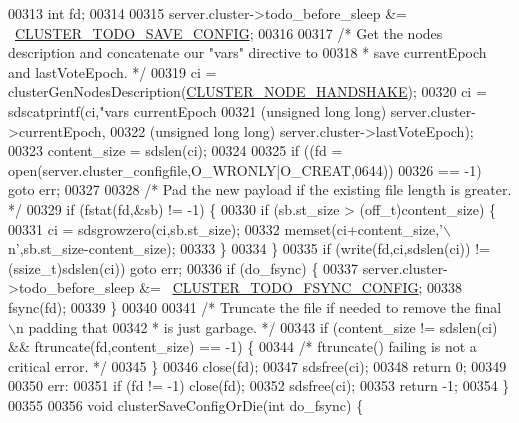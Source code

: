 \begin{DoxyCode}
{{{00313     \textcolor{keywordtype}{int} fd;
00314 
00315     server.cluster->todo\_before\_sleep &= ~\hyperlink{cluster_8h_a0ae5ff08fbae3c655012b4de8bfc327d}{CLUSTER\_TODO\_SAVE\_CONFIG};
00316 
00317     \textcolor{comment}{/* Get the nodes description and concatenate our "vars" directive to}
00318 \textcolor{comment}{     * save currentEpoch and lastVoteEpoch. */}
00319     ci = clusterGenNodesDescription(\hyperlink{cluster_8h_a60571342a067f1e5772a04b36feff6a6}{CLUSTER\_NODE\_HANDSHAKE});
00320     ci = sdscatprintf(ci,\textcolor{stringliteral}{"vars currentEpoch %
00321         (\textcolor{keywordtype}{unsigned} \textcolor{keywordtype}{long} \textcolor{keywordtype}{long}) server.cluster->currentEpoch,
00322         (\textcolor{keywordtype}{unsigned} \textcolor{keywordtype}{long} \textcolor{keywordtype}{long}) server.cluster->lastVoteEpoch);
00323     content\_size = sdslen(ci);
00324 
00325     \textcolor{keywordflow}{if} ((fd = open(server.cluster\_configfile,O\_WRONLY|O\_CREAT,0644))
00326         == -1) \textcolor{keywordflow}{goto} err;
00327 
00328     \textcolor{comment}{/* Pad the new payload if the existing file length is greater. */}
00329     \textcolor{keywordflow}{if} (fstat(fd,&sb) != -1) \{
00330         \textcolor{keywordflow}{if} (sb.st\_size > (off\_t)content\_size) \{
00331             ci = sdsgrowzero(ci,sb.st\_size);
00332             memset(ci+content\_size,\textcolor{stringliteral}{'\(\backslash\)n'},sb.st\_size-content\_size);
00333         \}
00334     \}
00335     \textcolor{keywordflow}{if} (write(fd,ci,sdslen(ci)) != (ssize\_t)sdslen(ci)) \textcolor{keywordflow}{goto} err;
00336     \textcolor{keywordflow}{if} (do\_fsync) \{
00337         server.cluster->todo\_before\_sleep &= ~\hyperlink{cluster_8h_accc9a00230cd04789db2398bb3ab715a}{CLUSTER\_TODO\_FSYNC\_CONFIG};
00338         fsync(fd);
00339     \}
00340 
00341     \textcolor{comment}{/* Truncate the file if needed to remove the final \(\backslash\)n padding that}
00342 \textcolor{comment}{     * is just garbage. */}
00343     \textcolor{keywordflow}{if} (content\_size != sdslen(ci) && ftruncate(fd,content\_size) == -1) \{
00344         \textcolor{comment}{/* ftruncate() failing is not a critical error. */}
00345     \}
00346     close(fd);
00347     sdsfree(ci);
00348     \textcolor{keywordflow}{return} 0;
00349 
00350 err:
00351     \textcolor{keywordflow}{if} (fd != -1) close(fd);
00352     sdsfree(ci);
00353     \textcolor{keywordflow}{return} -1;
00354 \}
00355 
00356 \textcolor{keywordtype}{void} clusterSaveConfigOrDie(\textcolor{keywordtype}{int} do\_fsync) \{
}}}}
\end{DoxyCode}
